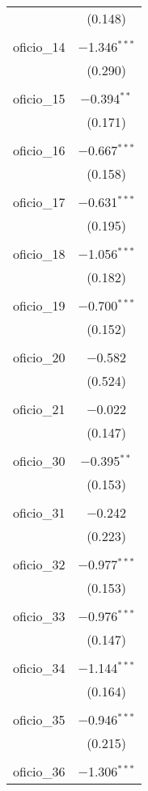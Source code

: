 \begin{table}[!htbp]
\begin{tabular}{@{\extracolsep{5pt}}lc}
  & (0.148) \\ 
  & \\ 
 oficio\_14 & $-$1.346$^{***}$ \\ 
  & (0.290) \\ 
  & \\ 
 oficio\_15 & $-$0.394$^{**}$ \\ 
  & (0.171) \\ 
  & \\ 
 oficio\_16 & $-$0.667$^{***}$ \\ 
  & (0.158) \\ 
  & \\ 
 oficio\_17 & $-$0.631$^{***}$ \\ 
  & (0.195) \\ 
  & \\ 
 oficio\_18 & $-$1.056$^{***}$ \\ 
  & (0.182) \\ 
  & \\ 
 oficio\_19 & $-$0.700$^{***}$ \\ 
  & (0.152) \\ 
  & \\ 
 oficio\_20 & $-$0.582 \\ 
  & (0.524) \\ 
  & \\ 
 oficio\_21 & $-$0.022 \\ 
  & (0.147) \\ 
  & \\ 
 oficio\_30 & $-$0.395$^{**}$ \\ 
  & (0.153) \\ 
  & \\ 
 oficio\_31 & $-$0.242 \\ 
  & (0.223) \\ 
  & \\ 
 oficio\_32 & $-$0.977$^{***}$ \\ 
  & (0.153) \\ 
  & \\ 
 oficio\_33 & $-$0.976$^{***}$ \\ 
  & (0.147) \\ 
  & \\ 
 oficio\_34 & $-$1.144$^{***}$ \\ 
  & (0.164) \\ 
  & \\ 
 oficio\_35 & $-$0.946$^{***}$ \\ 
  & (0.215) \\ 
  & \\ 
 oficio\_36 & $-$1.306$^{***}$ \\ 

\end{tabular}
\end{table}
